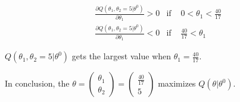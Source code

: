 \documentclass{article}
\begin{document}
\begin{equation}
\begin{aligned}
& \frac{\partial Q(\theta_1,\theta_2 = 5 | \theta^{0})}{ \partial \theta_1 } >0 & \mbox{if } & 0<\theta_1 < \frac{40}{17} \\
& \frac{\partial Q(\theta_1,\theta_2 = 5 | \theta^{0})}{ \partial \theta_1 } <0 & \mbox{if } & \frac{40}{17} < \theta_1 
\end{aligned}
\end{equation}

$Q(\theta_1,\theta_2 = 5 | \theta^{0})$ gets the largest value when $\theta_1 = \frac{40}{17}$.

In conclusion, the $\theta= \left( \begin{array}{c}  \theta_1 \\  \theta_2
    \end{array} \right) =\left( \begin{array}{c}  \frac{40}{17} \\  5
    \end{array} \right) $ maximizes $Q(\theta | \theta^{0})$. 

%
%
\end{document}

